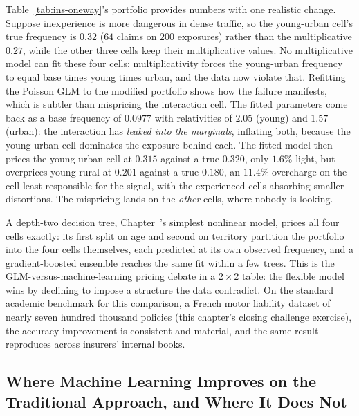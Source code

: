 \documentclass[../ai_in_finance]{subfiles}
\begin{document}
Table~\ref{tab:ins-oneway}'s portfolio provides numbers with one realistic change. Suppose inexperience is more dangerous in dense traffic, so the young-urban cell's true frequency is $0.32$ ($64$ claims on $200$ exposures) rather than the multiplicative $0.27$, while the other three cells keep their multiplicative values. No multiplicative model can fit these four cells: multiplicativity forces the young-urban frequency to equal base times young times urban, and the data now violate that. Refitting the Poisson GLM to the modified portfolio shows how the failure manifests, which is subtler than mispricing the interaction cell. The fitted parameters come back as a base frequency of $0.0977$ with relativities of $2.05$ (young) and $1.57$ (urban): the interaction has \emph{leaked into the marginals}, inflating both, because the young-urban cell dominates the exposure behind each. The fitted model then prices the young-urban cell at $0.315$ against a true $0.320$, only $1.6\%$ light, but overprices young-rural at $0.201$ against a true $0.180$, an $11.4\%$ overcharge on the cell least responsible for the signal, with the experienced cells absorbing smaller distortions. The mispricing lands on the \emph{other} cells, where nobody is looking.

A depth-two decision tree, Chapter~'s simplest nonlinear model, prices all four cells exactly: its first split on age and second on territory partition the portfolio into the four cells themselves, each predicted at its own observed frequency, and a gradient-boosted ensemble reaches the same fit within a few trees. This is the GLM-versus-machine-learning pricing debate in a $2 \times 2$ table: the flexible model wins by declining to impose a structure the data contradict. On the standard academic benchmark for this comparison, a French motor liability dataset of nearly seven hundred thousand policies (this chapter's closing challenge exercise), the accuracy improvement is consistent and material, and the same result reproduces across insurers' internal books.

\subsection{Where Machine Learning Improves on the Traditional Approach, and Where It Does Not}
\label{sec:ins-beyond-glm}
\end{document}
